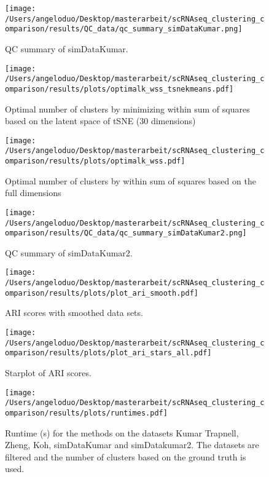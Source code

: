 \documentclass[12pt, a4paper]{article}\usepackage[]{graphicx}\usepackage[]{color}
\begin{document}
\begin{figure}[!h]
\texttt{[image: /Users/angeloduo/Desktop/masterarbeit/scRNAseq\_clustering\_comparison/results/QC\_data/qc\_summary\_simDataKumar.png]}
\caption{QC summary of simDataKumar. }
\label{fig:simDataKumar}
\end{figure}

\begin{figure}[!h]
\texttt{[image: /Users/angeloduo/Desktop/masterarbeit/scRNAseq\_clustering\_comparison/results/plots/optimalk\_wss\_tsnekmeans.pdf]}
\caption{Optimal number of clusters by minimizing within sum of squares based on the latent space of tSNE (30 dimensions) }
\label{fig:wsstsne}
\end{figure}

\begin{figure}[!h]
\texttt{[image: /Users/angeloduo/Desktop/masterarbeit/scRNAseq\_clustering\_comparison/results/plots/optimalk\_wss.pdf]}
\caption{Optimal number of clusters by within sum of squares based on the full dimensions }
\label{fig:wssorg}
\end{figure}



\begin{figure}[!h]
\texttt{[image: /Users/angeloduo/Desktop/masterarbeit/scRNAseq\_clustering\_comparison/results/QC\_data/qc\_summary\_simDataKumar2.png]}
\caption{QC summary of simDataKumar2. }
\label{fig:simDataKumar}
\end{figure}
\clearpage


\begin{figure}[!h]
\texttt{[image: /Users/angeloduo/Desktop/masterarbeit/scRNAseq\_clustering\_comparison/results/plots/plot\_ari\_smooth.pdf]}
\caption{ARI scores with smoothed data sets.  }
\label{fig:arifilt}
\end{figure}




\begin{figure}[!h]
\texttt{[image: /Users/angeloduo/Desktop/masterarbeit/scRNAseq\_clustering\_comparison/results/plots/plot\_ari\_stars\_all.pdf]}
\caption{Starplot of ARI scores.  }
\label{fig:arirank}
\end{figure}







\begin{figure}[!h]
\texttt{[image: /Users/angeloduo/Desktop/masterarbeit/scRNAseq\_clustering\_comparison/results/plots/runtimes.pdf]}
\caption{Runtime (s) for the methods on the datasets Kumar Trapnell, Zheng, Koh, simDataKumar and simDatakumar2. The datasets are filtered and the number of clusters based on the ground truth is used.}
\label{fig:runtime}
\end{figure}
\end{document}
